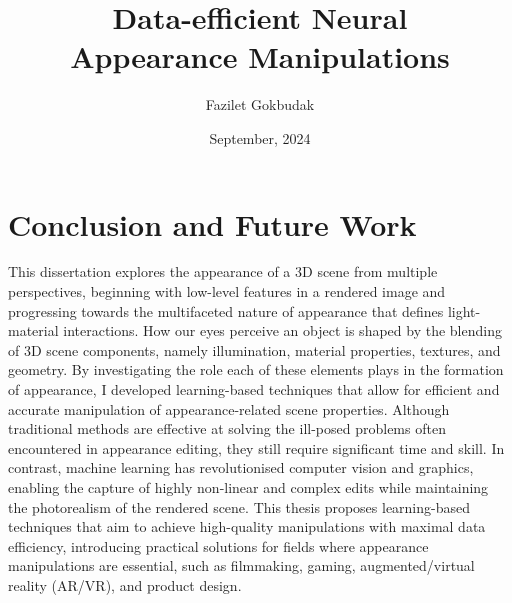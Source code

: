\documentclass[withindex, glossary]{cam-thesis}
\title{Data-efficient Neural\\
Appearance Manipulations}
\author{Fazilet Gokbudak}
\date{September, 2024}
\begin{document}
\frontmatter{}












\chapter{Conclusion and Future Work}
This dissertation explores the appearance of a 3D scene from multiple perspectives, beginning with low-level features in a rendered image and progressing towards the multifaceted nature of appearance that defines light-material interactions. How our eyes perceive an object is shaped by the blending of 3D scene components, namely illumination, material properties, textures, and geometry. By investigating the role each of these elements plays in the formation of appearance, I developed learning-based techniques that allow for efficient and accurate manipulation of appearance-related scene properties. Although traditional methods are effective at solving the ill-posed problems often encountered in appearance editing, they still require significant time and skill. In contrast, machine learning has revolutionised computer vision and graphics, enabling the capture of highly non-linear and complex edits while maintaining the photorealism of the rendered scene. This thesis proposes learning-based techniques that aim to achieve high-quality manipulations with maximal data efficiency, introducing practical solutions for fields where appearance manipulations are essential, such as filmmaking, gaming, augmented/virtual reality (\gls{AR/VR}), and product design.
\end{document}
